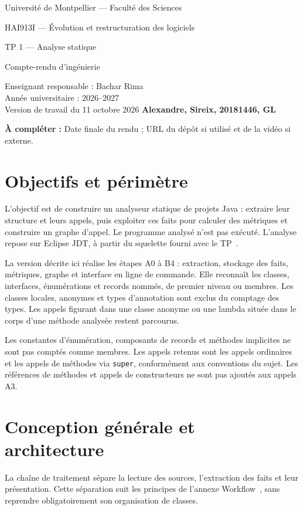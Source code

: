\documentclass[11pt,a4paper]{article}
\newcommand{\todo}[1]{\par\smallskip\noindent\textcolor{red!65!black}{\textbf{À compléter :} #1}\par\smallskip}
\newcommand{\code}[1]{\texttt{#1}}
\begin{document}
\begin{titlepage}
\centering
{\large Université de Montpellier --- Faculté des Sciences\par}
\vspace{1cm}
{\large HAI913I --- Évolution et restructuration des logiciels\par}
\vspace{1.5cm}
{\Huge TP 1 --- Analyse statique\par}
\vspace{0.5cm}
{\Large Compte-rendu d'ingénierie\par}
\vspace{1cm}
Enseignant responsable : Bachar Rima\\
Année universitaire : 2026--2027\\
Version de travail du 11 octobre 2026
\vspace{1.5cm}
\textbf{Alexandre, Sireix, 20181446, GL}
\vfill
\todo{Date finale du rendu ; URL du dépôt si utilisé et de la vidéo si externe.}
\end{titlepage}
\tableofcontents
\newpage

\section{Objectifs et périmètre}
L'objectif est de construire un analyseur statique de projets Java : extraire leur structure et leurs appels, puis exploiter ces faits pour calculer des métriques et construire un graphe d'appel. Le programme analysé n'est pas exécuté. L'analyse repose sur Eclipse JDT, à partir du squelette fourni avec le TP~\cite{sujet,jdt}.

La version décrite ici réalise les étapes A0 à B4 : extraction, stockage des faits, métriques, graphe et interface en ligne de commande. Elle reconnaît les classes, interfaces, énumérations et records nommés, de premier niveau ou membres. Les classes locales, anonymes et types d'annotation sont exclus du comptage des types. Les appels figurant dans une classe anonyme ou une lambda située dans le corps d'une méthode analysée restent parcourus.

Les constantes d'énumération, composants de records et méthodes implicites ne sont pas comptés comme membres. Les appels retenus sont les appels ordinaires et les appels de méthodes via \code{super}, conformément aux conventions du sujet. Les références de méthodes et appels de constructeurs ne sont pas ajoutés aux appels A3.

\section{Conception générale et architecture}
La chaîne de traitement sépare la lecture des sources, l'extraction des faits et leur présentation. Cette séparation suit les principes de l'annexe Workflow~\cite{workflow}, sans reprendre obligatoirement son organisation de classes.
\end{document}
